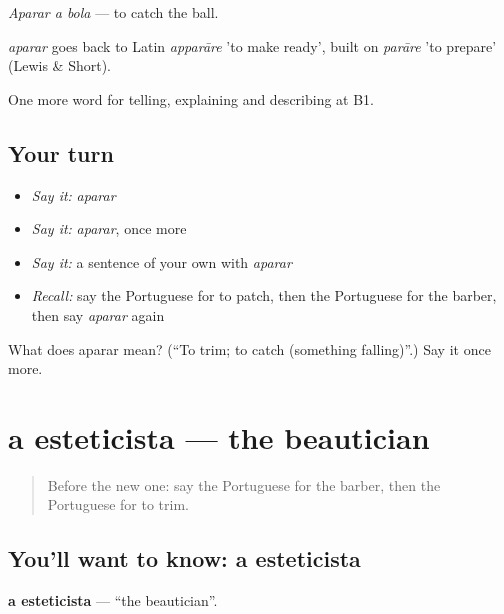 \emph{Aparar a bola} — to catch the ball.

\begin{cousinweb}
\emph{aparar} goes back to Latin \emph{apparāre} 'to make ready', built on \emph{parāre} 'to prepare' (Lewis \& Short).
\end{cousinweb}

\begin{grammarlens}[title={What you've built}]
One more word for telling, explaining and describing at B1.
\end{grammarlens}

\subsection*{Your turn}
\begin{itemize}
\raggedright
  \item \emph{Say it:} \emph{aparar}
  \item \emph{Say it:} \emph{aparar}, once more
  \item \emph{Say it:} a sentence of your own with \emph{aparar}
  \item \emph{Recall:} say the Portuguese for to patch, then the Portuguese for the barber, then say \emph{aparar} again
\end{itemize}

\begin{tcolorbox}[breakable,colback=teal!4,colframe=teal!35!black,title={Before you move on}]
What does aparar mean? (\textquotedblleft{}To trim; to catch (something falling)\textquotedblright{}.) Say it once more.
\end{tcolorbox}
\section[a esteticista]{a esteticista — the beautician}

\label{lesson:PT-C452-esteticista}



\begin{quote}
Before the new one: say the Portuguese for the barber, then the Portuguese for to trim.
\end{quote}

\subsection*{You'll want to know: a esteticista}
\textbf{a esteticista} — \textquotedblleft{}the beautician\textquotedblright{}.

